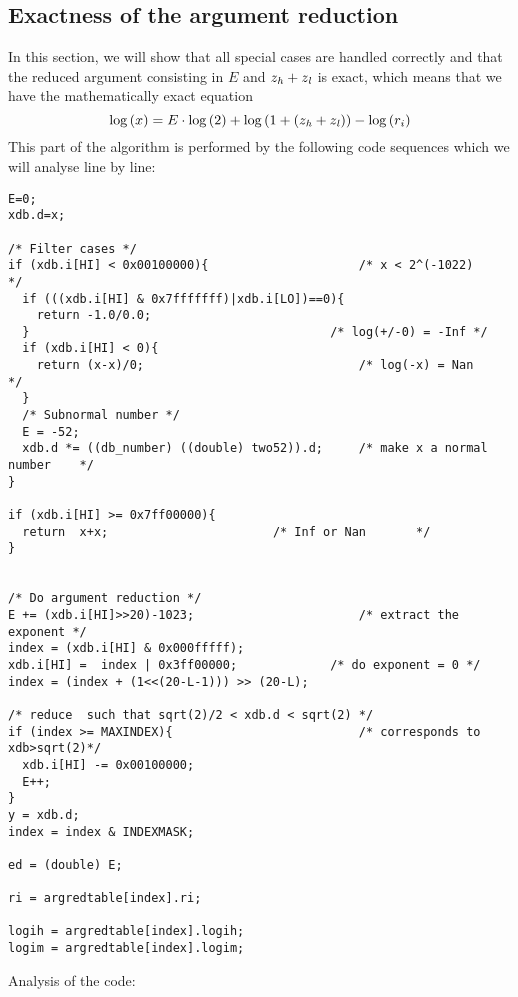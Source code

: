 \subsection{Exactness of the argument reduction\label{subsec:reduction}}
In this section, we will show that all special cases are handled correctly and that the 
reduced argument consisting in $E$ and $z_{\mathit{h}} + z_{\mathit{l}}$ is exact, which means that we have the mathematically exact 
equation
$$\log\left( x \right) = E \cdot \log\left( 2 \right) + \log\left( 1 + \left( z_{\mathit{h}} + z_{\mathit{l}} \right) \right) - \log\left( r_i \right)$$
This part of the algorithm is performed by the following code sequences which we will analyse line by line:
\begin{lstlisting}[caption={Handling of special cases and table access},firstnumber=1]
E=0;
xdb.d=x;

/* Filter cases */
if (xdb.i[HI] < 0x00100000){                     /* x < 2^(-1022)    */
  if (((xdb.i[HI] & 0x7fffffff)|xdb.i[LO])==0){
    return -1.0/0.0;     
  }                    		                 /* log(+/-0) = -Inf */
  if (xdb.i[HI] < 0){ 
    return (x-x)/0;                              /* log(-x) = Nan    */
  }
  /* Subnormal number */
  E = -52; 		
  xdb.d *= ((db_number) ((double) two52)).d; 	 /* make x a normal number    */ 
}
    
if (xdb.i[HI] >= 0x7ff00000){
  return  x+x;				         /* Inf or Nan       */
}
     

/* Do argument reduction */
E += (xdb.i[HI]>>20)-1023;                       /* extract the exponent */
index = (xdb.i[HI] & 0x000fffff);
xdb.i[HI] =  index | 0x3ff00000;	         /* do exponent = 0 */
index = (index + (1<<(20-L-1))) >> (20-L);
 
/* reduce  such that sqrt(2)/2 < xdb.d < sqrt(2) */
if (index >= MAXINDEX){                          /* corresponds to xdb>sqrt(2)*/
  xdb.i[HI] -= 0x00100000; 
  E++;
}
y = xdb.d;
index = index & INDEXMASK;

ed = (double) E;

ri = argredtable[index].ri;

logih = argredtable[index].logih;
logim = argredtable[index].logim;
\end{lstlisting}
Analysis of the code: 
